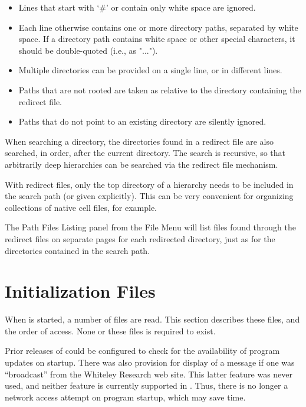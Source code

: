 \begin{itemize}
\item{Lines that start with `{\vt \#}' or contain only white space
  are ignored.}
\item{Each line otherwise contains one or more directory paths,
  separated by white space.  If a directory path contains white
  space or other special characters, it should be double-quoted
  (i.e., as {\vt "..."}).}
\item{Multiple directories can be provided on a single line, or in
  different lines.}
\item{Paths that are not rooted are taken as relative to the
  directory containing the redirect file.}
\item{Paths that do not point to an existing directory are silently
  ignored.}
\end{itemize}

When searching a directory, the directories found in a redirect file
are also searched, in order, after the current directory.  The search
is recursive, so that arbitrarily deep hierarchies can be searched via
the redirect file mechanism.

With redirect files, only the top directory of a hierarchy needs to be
included in the search path (or given explicitly).  This can be very
convenient for organizing collections of native cell files, for
example.

The {\cb Path Files Listing} panel from the {\cb File Menu} will list
files found through the redirect files on separate pages for each
redirected directory, just as for the directories contained in the
search path.


\section{Initialization Files}

When {\Xic} is started, a number of files are read.  This section
describes these files, and the order of access.  None or these files
is required to exist.

Prior releases of {\Xic} could be configured to check for the
availability of program updates on startup.  There was also provision
for display of a message if one was ``broadcast'' from the Whiteley
Research web site.  This latter feature was never used, and neither
feature is currently supported in {\Xic}.  Thus, there is no longer a
network access attempt on program startup, which may save time.


